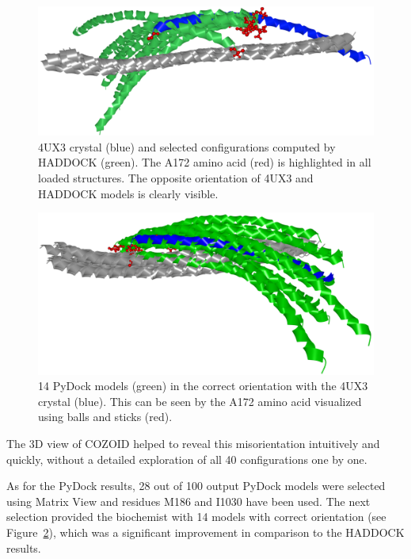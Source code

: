 \documentclass[twocolumn]{bmcart}%
\def\MatView {Matrix View\xspace}
\begin{document}
\begin{figure}[b]
  \centering
  \includegraphics[width=0.95\columnwidth]{images/figure11.png}
  \vspace{-10pt}
  \caption{4UX3 crystal (blue) and selected configurations computed by HADDOCK (green). The A172 amino acid (red) is highlighted in all loaded structures. The opposite orientation of 4UX3 and HADDOCK models is clearly visible.}
  \label{fig:coiled_haddock}
\end{figure}

\begin{figure}[t]
  \centering
  \includegraphics[width=0.9\columnwidth]{images/figure12.png}
    \vspace{-5pt}
  \caption{14 PyDock models (green) in the correct orientation with the 4UX3 crystal (blue). This can be seen by the A172 amino acid visualized using balls and sticks (red).}
  \label{fig:selection2SMC3PyDock}
\end{figure}


The 3D view of COZOID helped to reveal this misorientation intuitively and quickly, without a detailed exploration of all 40 configurations one by one.

As for the PyDock results, 28 out of 100 output PyDock models were selected using \MatView and residues M186 and I1030 have been used.
The next selection provided the biochemist with 14 models with correct orientation (see Figure~\ref{fig:selection2SMC3PyDock}), which was a significant improvement in comparison to the HADDOCK results.
\end{document}
